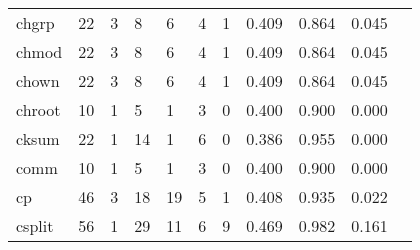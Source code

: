 \begin{longtable}{lp{1.10cm}p{1.10cm}p{1.10cm}p{1.10cm}p{1.10cm}p{1.10cm}p{1.10cm}p{1.10cm}p{1.10cm}p{1.10cm}}
chgrp     &                     22 &                                  3 &                                 8 &                                6 &                                 4 &                               1 &                          0.409 &                                 0.864 &                               0.045 \\
chmod     &                     22 &                                  3 &                                 8 &                                6 &                                 4 &                               1 &                          0.409 &                                 0.864 &                               0.045 \\
chown     &                     22 &                                  3 &                                 8 &                                6 &                                 4 &                               1 &                          0.409 &                                 0.864 &                               0.045 \\
chroot    &                     10 &                                  1 &                                 5 &                                1 &                                 3 &                               0 &                          0.400 &                                 0.900 &                               0.000 \\
cksum     &                     22 &                                  1 &                                14 &                                1 &                                 6 &                               0 &                          0.386 &                                 0.955 &                               0.000 \\
comm      &                     10 &                                  1 &                                 5 &                                1 &                                 3 &                               0 &                          0.400 &                                 0.900 &                               0.000 \\
cp        &                     46 &                                  3 &                                18 &                               19 &                                 5 &                               1 &                          0.408 &                                 0.935 &                               0.022 \\
csplit    &                     56 &                                  1 &                                29 &                               11 &                                 6 &                               9 &                          0.469 &                                 0.982 &                               0.161 \\

\end{longtable}
